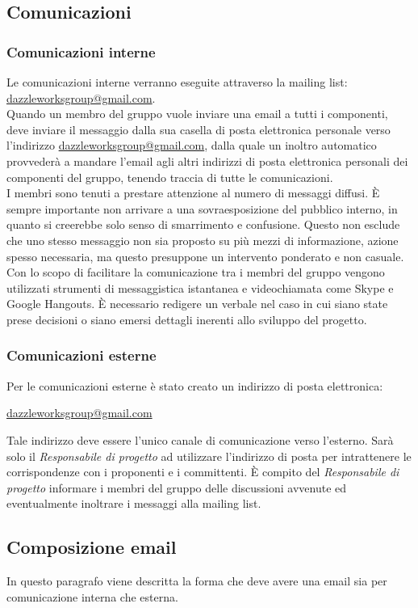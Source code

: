 	\subsection{Comunicazioni}
		\subsubsection{Comunicazioni interne}
Le comunicazioni interne verranno eseguite attraverso la mailing list: \url{dazzleworksgroup@gmail.com}. \\ 
Quando un membro del gruppo vuole inviare una email a tutti i componenti, deve inviare il messaggio dalla sua casella di posta elettronica personale verso l'indirizzo \url{dazzleworksgroup@gmail.com}, dalla quale un inoltro automatico provvederà a mandare l'email agli altri indirizzi di posta elettronica personali dei componenti del gruppo, tenendo traccia di tutte le comunicazioni.\\ 
I membri sono tenuti a prestare attenzione al numero di messaggi diffusi. È sempre importante non arrivare a una sovraesposizione del pubblico interno, in quanto si creerebbe solo senso di smarrimento e confusione. Questo non esclude che uno stesso messaggio non sia proposto su più mezzi di informazione, azione spesso necessaria, ma questo presuppone un intervento ponderato e non casuale.\\
Con lo scopo di facilitare la comunicazione tra i membri del gruppo vengono utilizzati strumenti di messaggistica istantanea e videochiamata come Skype e Google Hangouts.
È necessario redigere un verbale nel caso in cui siano state prese decisioni o siano emersi dettagli inerenti allo sviluppo del progetto. 
		\subsubsection{Comunicazioni esterne}
Per le comunicazioni esterne è stato creato un indirizzo di posta elettronica:
\begin{center}
\url{dazzleworksgroup@gmail.com}
\end{center}
Tale indirizzo deve essere l'unico canale di comunicazione verso l'esterno. Sarà solo il \textit{Responsabile di progetto} ad utilizzare l'indirizzo di posta per intrattenere le corrispondenze con i proponenti e i committenti. È compito del \textit{Responsabile di progetto} informare i membri del gruppo delle discussioni avvenute ed eventualmente inoltrare i messaggi alla mailing list.

	\subsection{Composizione email}
In questo paragrafo viene descritta la forma che deve avere una email sia per comunicazione interna che esterna.
